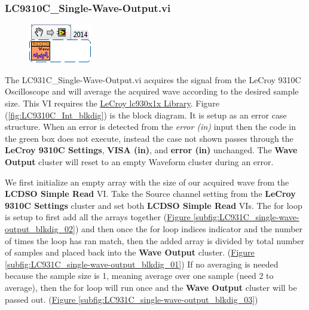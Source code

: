 \documentclass[11pt,a4paper,oldfontcommands]{memoir}
\begin{document}
\subsubsection{LC9310C\_Single-Wave-Output.vi} \label{LC9310C_swo}
\noindent\hrulefill

\begin{figure}[H]
	\includegraphics[scale=0.625]{LC931C_single-wave-output_main_01}
	\label{fig:LC9310C_single-wave-output_main_01}
\end{figure}

The LC931C\_Single-Wave-Output.vi acquires the signal from the LeCroy 9310C Oscilloscope and will average the acquired wave according to the desired sample size. This VI requires the \href{http://sine.ni.com/apps/utf8/niid_web_display.download_page?p_id_guid=E3B19B3E9608659CE034080020E74861}{LeCroy lc930x1x Library}. Figure (\ref{fig:LC9310C_Int_blkdig}) is the block diagram.  It is setup as an error case structure. When an error is detected from the \textit{error (in)} input then the code in the green box does not execute, instead the case not shown passes through the \textbf{LeCroy 9310C Settings}, \textbf{VISA (in)}, and \textbf{error (in)} unchanged. The \textbf{Wave Output} cluster will reset to an empty Waveform cluster during an error.

We first initialize an empty array with the size of our acquired wave from the \textbf{LCDSO Simple Read} VI. Take the Source channel setting from the \textbf{LeCroy 9310C Settings} cluster and set both \textbf{LCDSO Simple Read} VIs. The for loop is setup to first add all the arrays together (\hyperref[subfig:LC931C_single-wave-output_blkdig_02]{Figure \ref{subfig:LC931C_single-wave-output_blkdig_02}}) and then once the for loop indices indicator and the number of times the loop has ran match, then the added array is divided by total number of samples and placed back into the \textbf{Wave Output} cluster. (\hyperref[subfig:LC931C_single-wave-output_blkdig_01]{Figure \ref{subfig:LC931C_single-wave-output_blkdig_01}}) If no averaging is needed because the sample size is 1, meaning average over one sample (need 2 to average), then the for loop will run once and the \textbf{Wave Output} cluster will be passed out. (\hyperref[subfig:LC931C_single-wave-output_blkdig_03]{Figure \ref{subfig:LC931C_single-wave-output_blkdig_03}})
\end{document}
